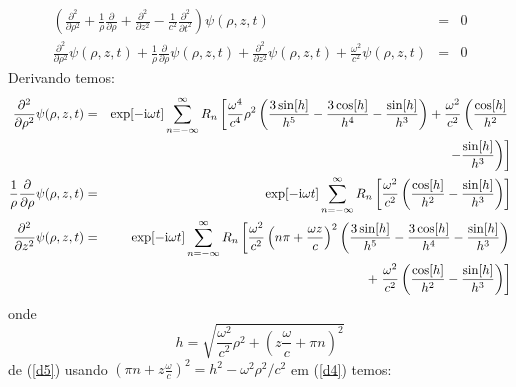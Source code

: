 \begin{eqnarray}
\left( \frac{\partial^2}{\partial \rho^2}+\frac{1}{\rho}\frac{\partial}{\partial\rho}+  \frac{\partial^2}{\partial z^2} - \frac{1}{c^2}\frac{\partial^2}{\partial t^2}\right)\psi(\rho, z, t)  &=&0\nonumber\\
 \frac{\partial^2}{\partial \rho^2}\psi(\rho, z, t)+\frac{1}{\rho}\frac{\partial}{\partial\rho}\psi(\rho, z, t)+  \frac{\partial^2}{\partial z^2}\psi(\rho, z, t) + \frac{\omega^2}{c^2}\psi(\rho, z, t)  &=&0 \label{d1}
\end{eqnarray}
Derivando temos:
\begin{eqnarray}
  \frac{\partial^2}{\partial \rho^2}\psi(\rho, z, t) &=&  \exp[-{\rm i}\omega t]\sum\limits_{n=-\infty}^{\infty}R_n  \left[\frac{\omega^4 }{c^4}\rho ^2 \left(\frac{3 \sin[h]}{h^5}-\frac{3 \cos[h]}{ h^4}-\frac{\sin[h]}{ h^3}\right)+\frac{\omega^2 }{c^2 }\left(\frac{\cos[h]}{h^2} \right. \right.\nonumber\\
&& \left. \left. -\frac{\sin[h]}{h^3}\right) \right]\label{d2} \label{d2}\\
\frac{1}{\rho}\frac{\partial}{\partial\rho}\psi(\rho, z, t) &=& \exp[-{\rm i}\omega t]\sum\limits_{n=-\infty}^{\infty}R_n\left [ \frac{\omega^2}{c^2 } \left(\frac{\cos[h]}{h^2}-\frac{\sin[h]}{h^3}\right) \right] \label{d3}\\
 \frac{\partial^2}{\partial z^2} \psi (\rho, z, t)  &=&  \exp[-{\rm i}\omega t]\sum\limits_{n=-\infty}^{\infty}R_n\left[ \frac{\omega^2}{c^2 }\left(n \pi +\frac{\omega z}{c}\right)^2\left( \frac{3 \sin[h]}{h^5}-\frac{3\cos[h]}{h^4}-\frac{\sin[h]}{h^3}\right) \right.\nonumber \\
&&+\left. \frac{\omega^2}{c^2} \left(\frac{\cos[h]}{h^2}-\frac{\sin[h]}{h^3}\right) \right] \label{d4}
\end{eqnarray}
onde
\begin{equation}\label{d5}
h= \sqrt{\frac{\omega^2}{c^2}\rho^2+(z\frac{\omega}{c}+\pi n)^2}
\end{equation}
de (\ref{d5}) usando $ (\pi n+z\frac{\omega}{c})^2 = h^2- \omega^2\rho^2/c^2$ em (\ref{d4}) temos:

